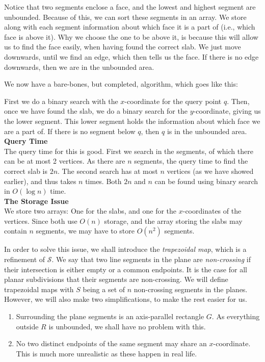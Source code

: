 Notice that two segments enclose a face, and the lowest and highest segment are unbounded. Because of this, we can sort these segments in an array. We store along with each segment information about which face it is a part of (i.e., which face is above it). Why we choose the one to be above it, is because this will allow us to find the face easily, when having found the correct slab. We just move downwards, until we find an edge, which then tells us the face. If there is no edge downwards, then we are in the unbounded area.

We now have a bare-bones, but completed, algorithm, which goes like this:

First we do a binary search with the $x$-coordinate for the query point $q$. Then, once we have found the slab, we do a binary search for the $y$-coordinate, giving us the lower segment. This lower segment holds the information about which face we are a part of. If there is no segment below $q$, then $q$ is in the unbounded area.\\
\noindent
\textbf{Query Time}\\
\noindent
The query time for this is good. First we search in the segments, of which there can be at most 2 vertices. As there are $n$ segments, the query time to find the correct slab is $2n$. The second search has at most $n$ vertices (as we have showed earlier), and thus takes $n$ times. Both $2n$ and $n$ can be found using binary search in $O(\log n)$ time.\\
\noindent
\textbf{The Storage Issue}\\
\noindent
We store two arrays: One for the slabs, and one for the $x$-coordinates of the vertices. Since both use $O(n)$ storage, and the array storing the slabs may contain $n$ segments, we may have to store $O(n^{2})$ segments.

In order to solve this issue, we shall introduce the \textit{trapezoidal map}, which is a refinement of $\mathcal{S}$. We say that two line segments in the plane are \textit{non-crossing} if their intersection is either empty or a common endpoints. It is the case for all planar subdivisions that their segments are non-crossing. We will define trapezoidal maps with $S$ being a set of $n$ non-crossing segments in the planes. However, we will also make two simplifications, to make the rest easier for us.
\begin{enumerate}
	\item Surrounding the plane segments is an axis-parallel rectangle $G$. As everything outside $R$ is unbounded, we shall have no problem with this.
	\item No two distinct endpoints of the same segment may share an $x$-coordinate. This is much more unrealistic as these happen in real life.
\end{enumerate}

